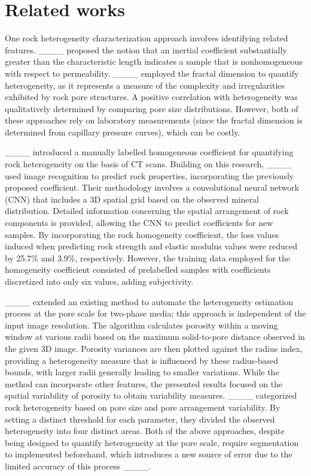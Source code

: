 \section{Related works}
\label{sec_related_works}

One rock heterogeneity characterization approach involves identifying related features. ____ proposed the notion that an inertial coefficient substantially greater than the characteristic length indicates a sample that is nonhomogeneous with respect to permeability. ____ employed the fractal dimension to quantify heterogeneity, as it represents a measure of the complexity and irregularities exhibited by rock pore structures. A positive correlation with heterogeneity was qualitatively determined by comparing pore size distributions. However, both of these approaches rely on laboratory measurements (since the fractal dimension is determined from capillary pressure curves), which can be costly.

____ introduced a manually labelled homogeneous coefficient for quantifying rock heterogeneity on the basis of CT scans. Building on this research, ____ used image recognition to predict rock properties, incorporating the previously proposed coefficient. Their methodology involves a convolutional neural network (CNN) that includes a 3D spatial grid based on the observed mineral distribution. Detailed information concerning the spatial arrangement of rock components is provided, allowing the CNN to predict coefficients for new samples. By incorporating the rock homogeneity coefficient, the loss values induced when predicting rock strength and elastic modulus values were reduced by 25.7\% and 3.9\%, respectively. However, the training data employed for the homogeneity coefficient consisted of prelabelled samples with coefficients discretized into only six values, adding subjectivity.

____ extended an existing method to automate the heterogeneity estimation process at the pore scale for two-phase media; this approach is independent of the input image resolution. The algorithm calculates porosity within a moving window at various radii based on the maximum solid-to-pore distance observed in the given 3D image. Porosity variances are then plotted against the radius index, providing a heterogeneity measure that is influenced by these radius-based bounds, with larger radii generally leading to smaller variations. While the method can incorporate other features, the presented results focused on the spatial variability of porosity to obtain variability measures. ____ categorized rock heterogeneity based on pore size and pore arrangement variability. By setting a distinct threshold for each parameter, they divided the observed heterogeneity into four distinct areas. Both of the above approaches, despite being designed to quantify heterogeneity at the pore scale, require segmentation to implemented beforehand, which introduces a new source of error due to the limited accuracy of this process ____.

